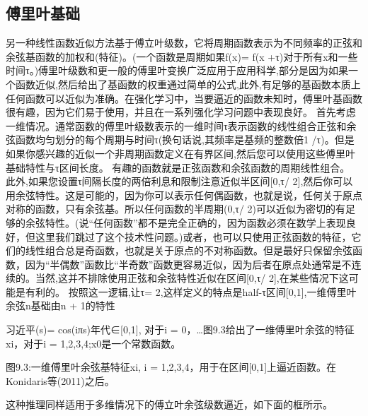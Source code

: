 \subsection{傅里叶基础}

另一种线性函数近似方法基于傅立叶级数，它将周期函数表示为不同频率的正弦和余弦基函数的加权和(特征)。(一个函数是周期如果f(x)= f(x +τ)对于所有x和一些时间τ。)傅里叶级数和更一般的傅里叶变换广泛应用于应用科学,部分是因为如果一个函数近似,然后给出了基函数的权重通过简单的公式,此外,有足够的基函数本质上任何函数可以近似为准确。在强化学习中，当要逼近的函数未知时，傅里叶基函数很有趣，因为它们易于使用，并且在一系列强化学习问题中表现良好。
首先考虑一维情况。通常函数的傅里叶级数表示的一维时间τ表示函数的线性组合正弦和余弦函数均匀划分的每个周期与时间τ(换句话说,其频率是基频的整数倍1 /τ)。但是如果你感兴趣的近似一个非周期函数定义在有界区间,然后您可以使用这些傅里叶基础特性与τ区间长度。
有趣的函数就是正弦函数和余弦函数的周期线性组合。
此外,如果您设置τ间隔长度的两倍利息和限制注意近似半区间[0,τ/ 2],然后你可以用余弦特性。这是可能的，因为你可以表示任何偶函数，也就是说，任何关于原点对称的函数，只有余弦基。所以任何函数的半周期(0,τ/ 2)可以近似为密切的有足够的余弦特性。(说“任何函数”都不是完全正确的，因为函数必须在数学上表现良好，但这里我们跳过了这个技术性问题。)或者，也可以只使用正弦函数的特征，它们的线性组合总是奇函数，也就是关于原点的不对称函数。但是最好只保留余弦函数，因为“半偶数”函数比“半奇数”函数更容易近似，因为后者在原点处通常是不连续的。当然,这并不排除使用正弦和余弦特性近似在区间[0,τ/ 2],在某些情况下这可能是有利的。
按照这一逻辑,让τ= 2,这样定义的特点是half-τ区间[0,1],一维傅里叶余弦n基础由n + 1的特性

习近平(s)= cos(iπs)年代∈[0,1],
对于i = 0，…图9.3给出了一维傅里叶余弦的特征xi，对于i = 1,2,3,4;x0是一个常数函数。
 

图9.3:一维傅里叶余弦基特征xi, i = 1,2,3,4，用于在区间[0,1]上逼近函数。在Konidaris等(2011)之后。

这种推理同样适用于多维情况下的傅立叶余弦级数逼近，如下面的框所示。
 
